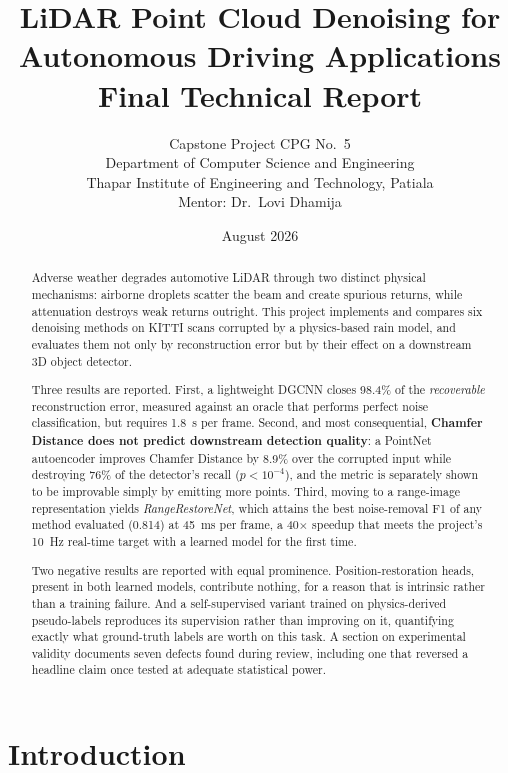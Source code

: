 \documentclass[11pt,a4paper]{article}
\title{\vspace{-1.8cm}\Large\bfseries LiDAR Point Cloud Denoising for\\
Autonomous Driving Applications\\[6pt]
\large Final Technical Report}
\author{Capstone Project CPG No.~5\\
Department of Computer Science and Engineering\\
Thapar Institute of Engineering and Technology, Patiala\\[4pt]
\small Mentor: Dr.~Lovi Dhamija}
\date{August 2026}
\begin{document}
\maketitle
\vspace{-0.6cm}

\begin{abstract}
\noindent
Adverse weather degrades automotive LiDAR through two distinct physical
mechanisms: airborne droplets scatter the beam and create spurious returns,
while attenuation destroys weak returns outright. This project implements and
compares six denoising methods on KITTI scans corrupted by a physics-based
rain model, and evaluates them not only by reconstruction error but by their
effect on a downstream 3D object detector.

Three results are reported. First, a lightweight DGCNN closes 98.4\% of the
\emph{recoverable} reconstruction error, measured against an oracle that
performs perfect noise classification, but requires 1.8~s per frame.
Second, and most consequential, \textbf{Chamfer Distance does not predict
downstream detection quality}: a PointNet autoencoder improves Chamfer
Distance by 8.9\% over the corrupted input while destroying 76\% of the
detector's recall ($p<10^{-4}$), and the metric is separately shown to be
improvable simply by emitting more points. Third, moving to a range-image
representation yields \emph{RangeRestoreNet}, which attains the best
noise-removal F1 of any method evaluated (0.814) at 45~ms per frame, a
40$\times$ speedup that meets the project's 10~Hz real-time target with a
learned model for the first time.

Two negative results are reported with equal prominence. Position-restoration
heads, present in both learned models, contribute nothing, for a reason
that is intrinsic rather than a training failure. And a self-supervised
variant trained on physics-derived pseudo-labels reproduces its supervision
rather than improving on it, quantifying exactly what ground-truth
labels are worth on this task. A section on experimental validity documents
seven defects found during review, including one that reversed a headline
claim once tested at adequate statistical power.
\end{abstract}

\tableofcontents
\newpage

\section{Introduction}
\end{document}
